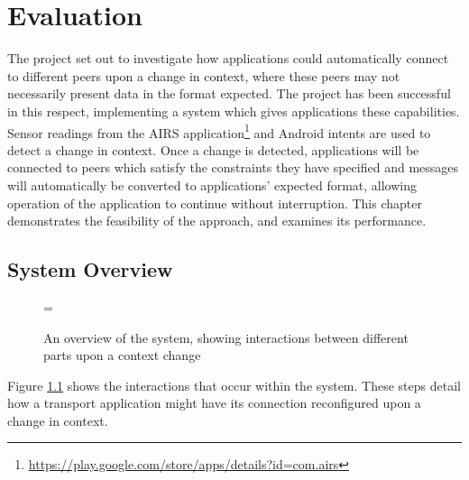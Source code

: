 \documentclass[12pt,twoside,notitlepage]{report}
\begin{document}
\cleardoublepage


\chapter{Evaluation}

The project set out to investigate how applications could automatically connect to different peers upon a change in context, where these peers may not necessarily present data in the format expected. 
The project has been successful in this respect, implementing a system which gives applications these capabilities.  
Sensor readings from the AIRS application\footnote{\url{https://play.google.com/store/apps/details?id=com.airs}} and Android intents are used to detect a change in context. 
Once a change is detected, applications will be connected to peers which satisfy the constraints they have specified and messages will automatically be converted to applications' expected format, allowing operation of the application to continue without interruption. 
This chapter demonstrates the feasibility of the approach, and examines its performance. 

\section{System Overview}

\begin{figure}[t]
\epsfxsize=\hsize
\centerline{}
\caption[System Overview]{An overview of the system, showing interactions between different parts upon a context change}
\label{fig:system_overview}
\end{figure}

Figure \ref{fig:system_overview} shows the interactions that occur within the system. 
These steps detail how a transport application might have its connection reconfigured upon a change in context. 
\end{document}
